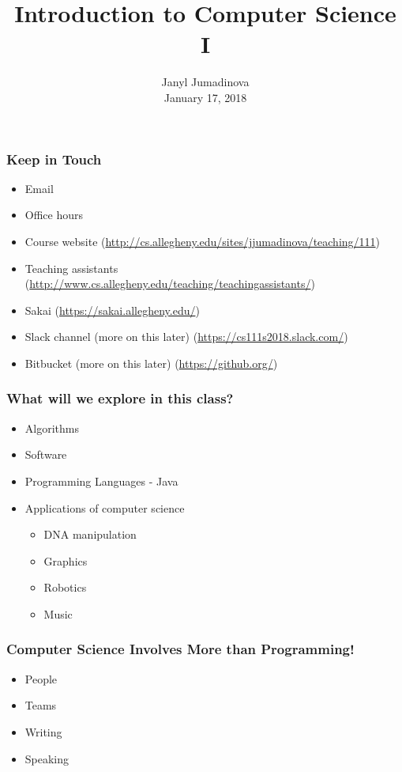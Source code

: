 \documentclass{beamer}
\title{Introduction to Computer Science I}
\author{Janyl Jumadinova \\ January 17, 2018}
\begin{document}
\begin{frame}
  \titlepage
\end{frame}

\begin{frame}
  \frametitle{Keep in Touch}
	\begin{itemize}
        \item Email
		\item Office hours
		\item Course website (\url{http://cs.allegheny.edu/sites/jjumadinova/teaching/111})
		\item Teaching assistants (\url{http://www.cs.allegheny.edu/teaching/teachingassistants/})
		\item Sakai (\url{https://sakai.allegheny.edu/})
		\item Slack channel (more on this later) (\url{https://cs111s2018.slack.com/})
		\item Bitbucket (more on this later) (\url{https://github.org/})
    \end{itemize}
\end{frame}

\begin{frame}
  \frametitle{What will we explore in this class?}
		\pause
      \begin{itemize}
        \item Algorithms
        \item Software 
        \item Programming Languages - Java
        \item Applications of computer science \pause
        \begin{itemize}
        	\item DNA manipulation
        	\item Graphics
        	\item Robotics 
        	\item Music
    	\end{itemize}
    \end{itemize}
\end{frame}

\begin{frame}
  \frametitle{Computer Science Involves More than Programming!}
	\begin{itemize}
		\item People
        \item Teams
        \item Writing
        \item Speaking
    \end{itemize}
\end{frame}
\end{document}
